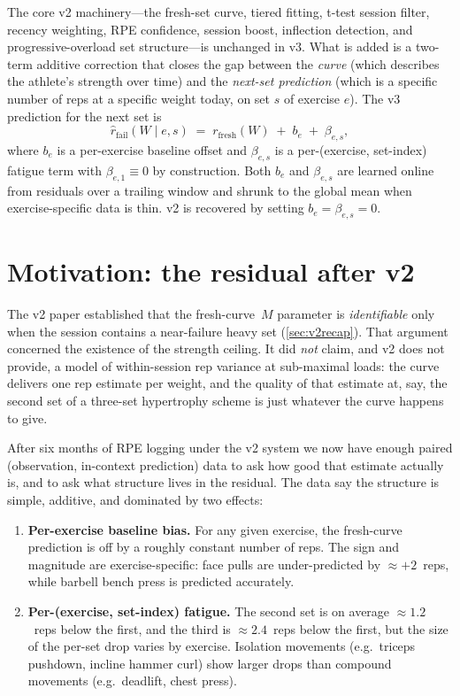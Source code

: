 \documentclass[11pt]{article}
\begin{document}
The core v2 machinery---the fresh-set curve, tiered fitting, t-test session filter, recency weighting, RPE confidence, session boost, inflection detection, and progressive-overload set structure---is unchanged in v3.
What is added is a two-term additive correction that closes the gap between the \emph{curve} (which describes the athlete's strength over time) and the \emph{next-set prediction} (which is a specific number of reps at a specific weight today, on set $s$ of exercise $e$).
The v3 prediction for the next set is
\begin{equation}
\label{eq:v3_prediction}
\hat r_{\mathrm{fail}}(W \mid e, s) \;=\; r_\mathrm{fresh}(W) \;+\; b_e \;+\; \beta_{e,s},
\end{equation}
where $b_e$ is a per-exercise baseline offset and $\beta_{e,s}$ is a per-(exercise, set-index) fatigue term with $\beta_{e,1}\equiv 0$ by construction.
Both $b_e$ and $\beta_{e,s}$ are learned online from residuals over a trailing window and shrunk to the global mean when exercise-specific data is thin.
v2 is recovered by setting $b_e=\beta_{e,s}=0$.

\section{Motivation: the residual after v2}
\label{sec:motivation}

The v2 paper established that the fresh-curve~$M$ parameter is \emph{identifiable} only when the session contains a near-failure heavy set (\cref{sec:v2recap}).
That argument concerned the existence of the strength ceiling.
It did \emph{not} claim, and v2 does not provide, a model of within-session rep variance at sub-maximal loads: the curve delivers one rep estimate per weight, and the quality of that estimate at, say, the second set of a three-set hypertrophy scheme is just whatever the curve happens to give.

After six months of RPE logging under the v2 system we now have enough paired (observation, in-context prediction) data to ask how good that estimate actually is, and to ask what structure lives in the residual.
The data say the structure is simple, additive, and dominated by two effects:

\begin{enumerate}
\item[(i)] \textbf{Per-exercise baseline bias.} For any given exercise, the fresh-curve prediction is off by a roughly constant number of reps.
The sign and magnitude are exercise-specific: face pulls are under-predicted by $\approx +2$~reps, while barbell bench press is predicted accurately.
\item[(ii)] \textbf{Per-(exercise, set-index) fatigue.} The second set is on average $\approx 1.2$~reps below the first, and the third is $\approx 2.4$~reps below the first, but the size of the per-set drop varies by exercise.
Isolation movements (e.g.\ triceps pushdown, incline hammer curl) show larger drops than compound movements (e.g.\ deadlift, chest press).
\end{enumerate}
\end{document}
